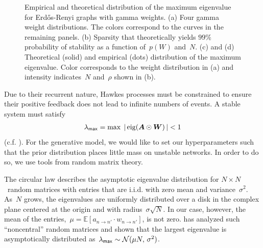 \begin{figure}[t]
\begin{center}
\begin{subfigure}[b]{.22\textwidth}
\end{subfigure}
\end{center}
\vspace{-1em}
\caption[Distribution of the maximum eigenvalue for Erd\H{o}s-Renyi
  graphs with gamma weights]{Empirical and theoretical distribution of
  the maximum eigenvalue for Erd\H{o}s-Renyi graphs with gamma
  weights. (a) Four gamma weight distributions. The colors correspond
  to the curves in the remaining panels. (b) Sparsity that
  theoretically yields ${99\%}$ probability of stability as a function
  of~${p(W)}$ and~$N$. (c) and (d) Theoretical (solid) and empirical
  (dots) distribution of the maximum eigenvalue. Color corresponds to
  the weight distribution in (a) and intensity indicates~$N$
  and~$\rho$ shown in (b).}
\label{fig:stability}
\end{figure}

Due to their recurrent nature, Hawkes processes must be constrained to
ensure their positive feedback does not lead to infinite numbers of
events. A stable system must satisfy
\begin{align*}
  \lambda_{\mathsf{max}}=\max\; |\,\mathrm{eig}(\boldsymbol{A}\odot\boldsymbol{W})\,| < 1
\end{align*}
(c.f. \citet{Daley-1988}).
For the generative model, we would like
to set our hyperparameters such that the prior distribution places
little mass on unstable networks. In order to do so, we use tools from
random matrix theory.

The circular law describes the asymptotic eigenvalue distribution for
$N \times N$~random matrices with entries that are i.i.d. with zero
mean and variance~$\sigma^2$. As~$N$ grows, the eigenvalues are
uniformly distributed over a disk in the complex plane centered at the
origin and with radius~$\sigma\sqrt{N}$. In our case, however, the
mean of the entries,~${\mu=\mathbb{E}[a_{n \to n'} \cdot w_{n \to
      n'}]}$, is not zero. \citet{Silverstein-1994} has analyzed such
``noncentral'' random matrices and shown that the largest eigenvalue
is asymptotically distributed
as~${\lambda_{\sf{max}} \sim \mathcal{N}(\mu N,\, \sigma^2)}$.

